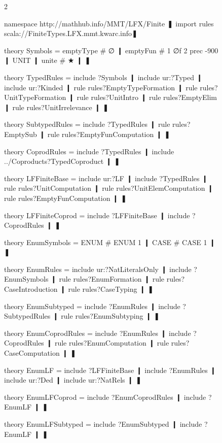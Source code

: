 \begin{figure}
\begin{multicols}{2}
\begin{mmtcode}[caption={Symbols and Rules (\cn{FiniteTypes.mmt})},label=lst:lf:lfx:finite:theories]
namespace http://mathhub.info/MMT/LFX/Finite ❚
import rules scala://FiniteTypes.LFX.mmt.kwarc.info❚

theory Symbols =
  emptyType # ∅ ❙
  emptyFun # 1 ∅f 2 prec -900 ❙
  UNIT ❙
  unite # ★ ❙
❚

theory TypedRules =
  include ?Symbols ❙
  include ur:?Typed ❙
  include ur:?Kinded ❙
  rule rules?EmptyTypeFormation ❙
  rule rules?UnitTypeFormation ❙
  rule rules?UnitIntro ❙
  rule rules?EmptyElim ❙
  rule rules?UnitIrrelevance ❙
❚

theory SubtypedRules =
  include ?TypedRules ❙
  rule rules?EmptySub ❙
  rule rules?EmptyFunComputation ❙
❚

theory CoprodRules =
  include ?TypedRules ❙
  include ../Coproducts?TypedCoproduct ❙
❚


theory LFFiniteBase =
  include ur:?LF ❙
  include ?TypedRules ❙
  rule rules?UnitComputation ❙
  rule rules?UnitElemComputation ❙
  rule rules?EmptyFunComputation ❙
❚

theory LFFiniteCoprod =
  include ?LFFiniteBase ❙
  include ?CoprodRules ❙
❚


theory EnumSymbols =
  ENUM # ENUM 1 ❙
  CASE # CASE 1 ❙
❚

theory EnumRules =
  include ur:?NatLiteralsOnly ❙
  include ?EnumSymbols ❙
  rule rules?EnumFormation ❙
  rule rules?CaseIntroduction ❙
  rule rules?CaseTyping ❙
❚

theory EnumSubtyped =
  include ?EnumRules ❙
  include ?SubtypedRules ❙
  rule rules?EnumSubtyping ❙
❚
\end{mmtcode}
\begin{mmtcode}
theory EnumCoprodRules =
  include ?EnumRules ❙
  include ?CoprodRules ❙
  rule rules?EnumComputation ❙
  rule rules?CaseComputation ❙
❚

theory EnumLF =
  include ?LFFiniteBase ❙
  include ?EnumRules ❙
  include ur:?Ded ❙
  include ur:?NatRels ❙
❚

theory EnumLFCoprod =
  include ?EnumCoprodRules ❙
  include ?EnumLF ❙
❚

theory EnumLFSubtyped =
  include ?EnumSubtyped ❙
  include ?EnumLF ❙
❚


\end{mmtcode}
\end{multicols}
\end{figure}
